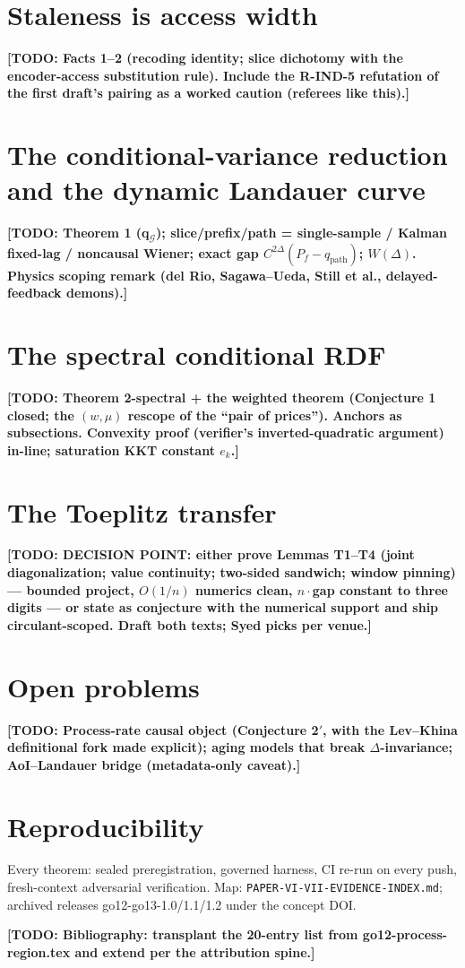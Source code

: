 \documentclass[11pt]{article}
\theoremstyle{remark}
\newcommand{\todo}[1]{\textbf{[TODO: #1]}}
\begin{document}
\section{Staleness is access width}
\todo{Facts 1--2 (recoding identity; slice dichotomy with the
encoder-access substitution rule). Include the R-IND-5 refutation of
the first draft's pairing as a worked caution (referees like this).}

\section{The conditional-variance reduction and the dynamic Landauer
curve}
\todo{Theorem 1 (q$_{\mathcal G}$); slice/prefix/path = single-sample
/ Kalman fixed-lag / noncausal Wiener; exact gap
$C^{2\Delta}(P_f-q_{\mathrm{path}})$; $W(\Delta)$. Physics scoping
remark (del Rio, Sagawa--Ueda, Still et al., delayed-feedback
demons).}

\section{The spectral conditional RDF}
\todo{Theorem 2-spectral + the weighted theorem (Conjecture 1 closed;
the $(w,\mu)$ rescope of the ``pair of prices''). Anchors as
subsections. Convexity proof (verifier's inverted-quadratic argument)
in-line; saturation KKT constant $e_k$.}

\section{The Toeplitz transfer}
\todo{DECISION POINT: either prove Lemmas T1--T4 (joint
diagonalization; value continuity; two-sided sandwich; window
pinning) --- bounded project, $O(1/n)$ numerics clean, $n\cdot$gap
constant to three digits --- or state as conjecture with the
numerical support and ship circulant-scoped. Draft both texts; Syed
picks per venue.}

\section{Open problems}
\todo{Process-rate causal object (Conjecture 2$'$, with the
Lev--Khina definitional fork made explicit); aging models that break
$\Delta$-invariance; AoI--Landauer bridge (metadata-only caveat).}

\section*{Reproducibility}
Every theorem: sealed preregistration, governed harness, CI re-run on
every push, fresh-context adversarial verification. Map:
\texttt{PAPER-VI-VII-EVIDENCE-INDEX.md}; archived releases
go12-go13-1.0/1.1/1.2 under the concept DOI.

\todo{Bibliography: transplant the 20-entry list from
go12-process-region.tex and extend per the attribution spine.}
\end{document}
